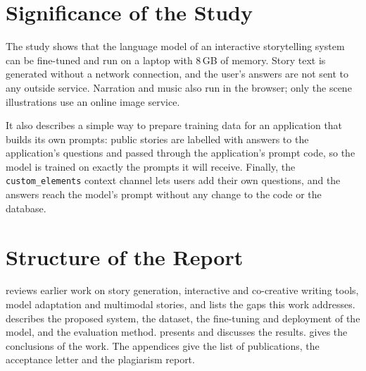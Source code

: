 \section{Significance of the Study}
\label{sec:intro-significance}

The study shows that the language model of an interactive storytelling system can be fine-tuned and run on a laptop with 8\,GB of memory. Story text is generated without a network connection, and the user's answers are not sent to any outside service. Narration and music also run in the browser; only the scene illustrations use an online image service.

It also describes a simple way to prepare training data for an application that builds its own prompts: public stories are labelled with answers to the application's questions and passed through the application's prompt code, so the model is trained on exactly the prompts it will receive. Finally, the \texttt{custom\_elements} context channel lets users add their own questions, and the answers reach the model's prompt without any change to the code or the database.

\section{Structure of the Report}
\label{sec:intro-structure}

 reviews earlier work on story generation, interactive and co-creative writing tools, model adaptation and multimodal stories, and lists the gaps this work addresses.  describes the proposed system, the dataset, the fine-tuning and deployment of the model, and the evaluation method.  presents and discusses the results.  gives the conclusions of the work. The appendices give the list of publications, the acceptance letter and the plagiarism report.
